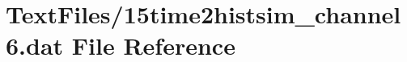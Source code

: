 \hypertarget{15time2histsim__channel6_8dat}{}\section{Text\+Files/15time2histsim\+\_\+channel6.dat File Reference}
\label{15time2histsim__channel6_8dat}
